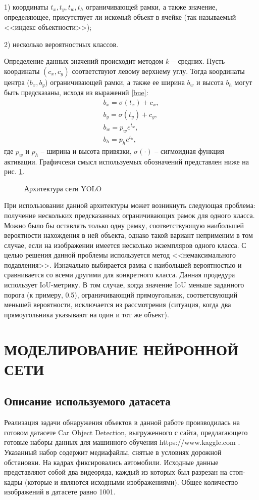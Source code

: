 \documentclass[14pt,a4paper]{extarticle}
\begin{document}
1) координаты $t_x, t_y, t_w, t_h$ ограничивающей рамки, а также значение, определяющее, присутствует ли искомый объект в ячейке (так называемый <<индекс объектности>>);

2) несколько вероятностных классов. 

Определение данных значений происходит методом $k-$средних. Пусть координаты $(c_x, c_y)$ соответствуют левому верхнему углу. Тогда координаты центра ($b_x, b_y$) ограничивающей рамки, а также ее ширина $b_w$ и высота $b_h$ могут быть предсказаны, исходя из выражений \eqref{bue}:
\begin{equation}
\begin{matrix}
b_x = \sigma(t_x) + c_x, \\
b_y = \sigma(t_y) + c_y,\\ \label{bue}
b_w = p_w e^{t_w},\\
b_h = p_h e^{t_h},
\end{matrix}
\end{equation}
где $p_w$ и $p_h$ -- ширина и высота привязки, $\sigma(\cdot)$ -- сигмоидная функция активации. Графичсеки смысл используемых обозначений представлен ниже на рис. \ref{yolbox}.

\begin{figure}[h]
\caption{Архитектура сети YOLO} \label{yolbox}
\end{figure}

При использовании данной архитектуры может возникнуть следующая проблема: получение нескольких предсказанных ограничивающих рамок для одного класса. Можно было бы оставлять только одну рамку, соответствующую наибольшей вероятности нахождения в ней объекта, однако такой вариант неприменим в том случае, если на изображении имеется несколько экземпляров одного класса. С целью решения данной проблемы используется метод <<немаксимального подавления>>. Изначально выбирается рамка с наибольшей вероятностью и сравнивается со всеми другими для конкретного класса. Данная продедура использует IoU-метрику. В том случае, когда значение IoU меньше заданного порога (к примеру, 0.5), ограничивающий прямоугольник, соответсвующий меньшей вероятности, исключается из рассмотрения (ситуация, когда два прямоугольника указывают на один и тот же объект).  

\newpage
\section{МОДЕЛИРОВАНИЕ НЕЙРОННОЙ СЕТИ}
\subsection{Описание используемого датасета}
Реализация задачи обнаружения объектов в данной работе производилась на готовом датасете Car Object Detection, выгруженного с сайта, предлагающего готовые наборы данных для машинного обучения https://www.kaggle.com \cite{dataset}. Указанный набор содержит медиафайлы, снятые в условиях дорожной обстановки. На кадрах фиксировались автомобили. Исходные данные представляют собой два видеоряда, каждый из которых был разрезан на стоп-кадры (которые и являются исходными изображениями). Общее количество изображений в датасете равно 1001.  
\end{document}
